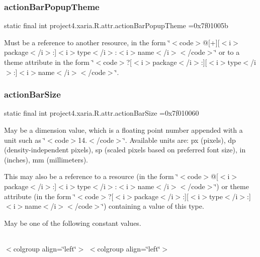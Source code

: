 \subsubsection{\texorpdfstring{action\+Bar\+Popup\+Theme}{actionBarPopupTheme}}
{\footnotesize\ttfamily static final int project4.\+xaria.\+R.\+attr.\+action\+Bar\+Popup\+Theme =0x7f01005b\hspace{0.3cm}{\ttfamily [static]}}

Must be a reference to another resource, in the form \char`\"{}$<$code$>$@\mbox{[}+\mbox{]}\mbox{[}$<$i$>$package$<$/i$>$\+:\mbox{]}$<$i$>$type$<$/i$>$\+:$<$i$>$name$<$/i$>$$<$/code$>$\char`\"{} or to a theme attribute in the form \char`\"{}$<$code$>$?\mbox{[}$<$i$>$package$<$/i$>$\+:\mbox{]}\mbox{[}$<$i$>$type$<$/i$>$\+:\mbox{]}$<$i$>$name$<$/i$>$$<$/code$>$\char`\"{}. \mbox{\label{classproject4_1_1xaria_1_1R_1_1attr_a43fe3425941b92ca33d6264c94a285a4}} 
\subsubsection{\texorpdfstring{action\+Bar\+Size}{actionBarSize}}
{\footnotesize\ttfamily static final int project4.\+xaria.\+R.\+attr.\+action\+Bar\+Size =0x7f010060\hspace{0.3cm}{\ttfamily [static]}}

May be a dimension value, which is a floating point number appended with a unit such as \char`\"{}$<$code$>$14.\+5sp$<$/code$>$\char`\"{}. Available units are\+: px (pixels), dp (density-\/independent pixels), sp (scaled pixels based on preferred font size), in (inches), mm (millimeters). 

This may also be a reference to a resource (in the form \char`\"{}$<$code$>$@\mbox{[}$<$i$>$package$<$/i$>$\+:\mbox{]}$<$i$>$type$<$/i$>$\+:$<$i$>$name$<$/i$>$$<$/code$>$\char`\"{}) or theme attribute (in the form \char`\"{}$<$code$>$?\mbox{[}$<$i$>$package$<$/i$>$\+:\mbox{]}\mbox{[}$<$i$>$type$<$/i$>$\+:\mbox{]}$<$i$>$name$<$/i$>$$<$/code$>$\char`\"{}) containing a value of this type. 

May be one of the following constant values.

\tabulinesep=1mm
\begin{longtabu} spread 0pt [c]{*{0}{|X[-1]}|}
\hline
\end{longtabu}
$<$colgroup align=\char`\"{}left\char`\"{}$>$ $<$colgroup align=\char`\"{}left\char`\"{}$>$ 

